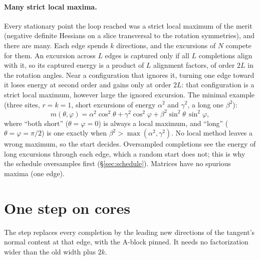 \documentclass[11pt]{article}
\theoremstyle{definition}
\theoremstyle{plain}
\begin{document}
\paragraph{Many strict local maxima.} Every stationary point the loop reached was a strict local maximum of the merit
(negative definite Hessians on a slice transversal to the rotation symmetries), and there are many. Each edge spends
$k$ directions, and the excursions of $N$ compete for them. An excursion across $L$ edges is captured only if all $L$
completions align with it, so its captured energy is a product of $L$ alignment factors, of order $2L$ in the
rotation angles. Near a configuration that ignores it, turning one edge toward it loses energy at second order and
gains only at order $2L$: that configuration is a strict local maximum, however large the ignored excursion. The
minimal example (three sites, $r=k=1$, short excursions of energy $\alpha^2$ and $\gamma^2$, a long one $\beta^2$):
\begin{equation}
  m(\theta,\varphi)=\alpha^2\cos^2\theta+\gamma^2\cos^2\varphi+\beta^2\sin^2\theta\,\sin^2\varphi ,
\end{equation}
where ``both short'' ($\theta=\varphi=0$) is always a local maximum, and ``long'' ($\theta=\varphi=\pi/2$) is one
exactly when $\beta^2>\max(\alpha^2,\gamma^2)$. No local method leaves a wrong maximum, so the start decides.
Oversampled completions see the energy of long excursions through each edge, which a random start does not; this is
why the schedule oversamples first (\S\ref{sec:schedule}). Matrices have no spurious maxima (one edge).

\section{One step on cores}\label{sec:step}

The step replaces every completion by the leading new directions of the tangent's normal content at that edge, with
the A-block pinned. It needs no factorization wider than the old width plus $2k$.
\end{document}
